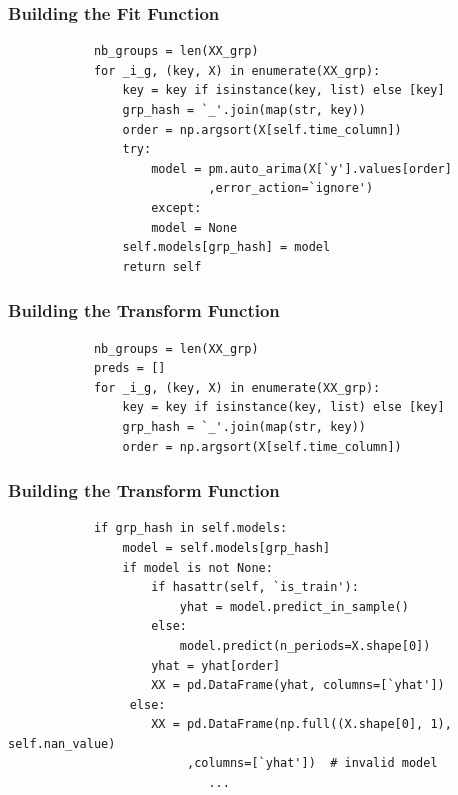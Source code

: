 \documentclass[11pt,
aspectratio=169,
hyperref={colorlinks}
]{beamer}
\begin{document}
\begin{frame}[fragile]
        \frametitle{Building the Fit Function}
        \begin{verbatim}
            nb_groups = len(XX_grp)
            for _i_g, (key, X) in enumerate(XX_grp):
                key = key if isinstance(key, list) else [key]
                grp_hash = `_'.join(map(str, key))
                order = np.argsort(X[self.time_column])
                try:
                    model = pm.auto_arima(X[`y'].values[order] 
                            ,error_action=`ignore')
                    except:
                    model = None
                self.models[grp_hash] = model
                return self
        \end{verbatim}
\end{frame}
\begin{frame}[fragile]
        \frametitle{Building the Transform Function}
        \begin{verbatim}
            nb_groups = len(XX_grp)
            preds = []
            for _i_g, (key, X) in enumerate(XX_grp):
                key = key if isinstance(key, list) else [key]
                grp_hash = `_'.join(map(str, key))
                order = np.argsort(X[self.time_column])
        \end{verbatim}
\end{frame}
\begin{frame}[fragile]
        \frametitle{Building the Transform Function}
        \begin{verbatim}
            if grp_hash in self.models:
	            model = self.models[grp_hash]
	            if model is not None:
	                if hasattr(self, `is_train'): 
	                    yhat = model.predict_in_sample()
	                else:
	                    model.predict(n_periods=X.shape[0])
	                yhat = yhat[order]
	                XX = pd.DataFrame(yhat, columns=[`yhat'])
	             else:
	                XX = pd.DataFrame(np.full((X.shape[0], 1), self.nan_value) 
	                     ,columns=[`yhat'])  # invalid model
	                        ...
        \end{verbatim}
\end{frame}
\end{document}
